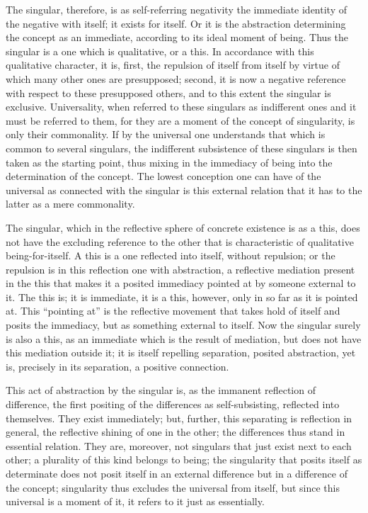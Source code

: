 The singular, therefore, is as self-referring negativity
the immediate identity of the negative with itself;
it exists for itself.
Or it is the abstraction determining
the concept as an immediate,
according to its ideal moment of being.
Thus the singular is a one which is qualitative, or a this.
In accordance with this qualitative character, it is,
first, the repulsion of itself from itself
by virtue of which many other ones are presupposed;
second, it is now a negative reference
with respect to these presupposed others,
and to this extent the singular is exclusive.
Universality, when referred to
these singulars as indifferent ones
and it must be referred to them,
for they are a moment of the concept of singularity,
is only their commonality.
If by the universal one understands
that which is common to several singulars,
the indifferent subsistence of these singulars is
then taken as the starting point,
thus mixing in the immediacy of being
into the determination of the concept.
The lowest conception one can have of
the universal as connected with the singular
is this external relation that it has
to the latter as a mere commonality.

The singular, which in the reflective sphere
of concrete existence is as a this,
does not have the excluding reference
to the other that is characteristic
of qualitative being-for-itself.
A this is a one reflected into itself, without repulsion;
or the repulsion is in this reflection one with abstraction,
a reflective mediation present in the this
that makes it a posited immediacy
pointed at by someone external to it.
The this is; it is immediate, it is a this,
however, only in so far as it is pointed at.
This “pointing at” is the reflective movement
that takes hold of itself and posits the immediacy,
but as something external to itself.
Now the singular surely is also a this,
as an immediate which is the result of mediation,
but does not have this mediation outside it;
it is itself repelling separation, posited abstraction,
yet is, precisely in its separation, a positive connection.

This act of abstraction by the singular is,
as the immanent reflection of difference,
the first positing of the differences as self-subsisting,
reflected into themselves.
They exist immediately;
but, further, this separating is reflection in general,
the reflective shining of one in the other;
the differences thus stand in essential relation.
They are, moreover, not singulars that
just exist next to each other;
a plurality of this kind belongs to being;
the singularity that posits itself as determinate
does not posit itself in an external difference
but in a difference of the concept;
singularity thus excludes the universal from itself,
but since this universal is a moment of it,
it refers to it just as essentially.

